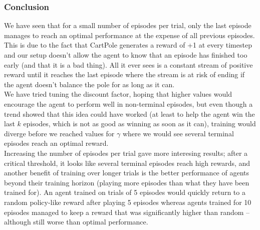 \subsubsection{Conclusion}
We have seen that for a small number of episodes per trial, only the last
episode manages to reach an optimal performance at the expense of all 
previous episodes. This is due to the fact that CartPole generates a reward
of +1 at every timestep and our setup doesn't allow the agent to 
know that an episode has finished too early (and that it is a bad thing).
All it ever sees is a constant stream of positive reward until it reaches
the last episode where the stream is at risk of ending if the agent doesn't
balance the pole for as long as it can.\\

We have tried tuning the discount factor, hoping that higher values would
encourage the agent to perform well in non-terminal episodes, but 
even though a trend showed that this idea could have worked (at least 
to help the agent win the last $k$ episodes, which is not as good as winning
as soon as it can), training would diverge before we reached values for $\gamma$
where we would see several terminal episodes reach an optimal reward.\\

Increasing the number of episodes per trial gave more interesing results;
after a critical threshold, it looks like several terminal episodes 
reach high rewards, and another benefit of training over longer trials is
the better performance of agents beyond their training horizon (playing
more episodes than what they have been trained for). An agent trained 
on trials of 5 episodes would quickly return to a random policy-like reward
after playing 5 episodes whereas agents trained for 10 episodes managed
to keep a reward that was significantly higher than random -- although still
worse than optimal performance.
